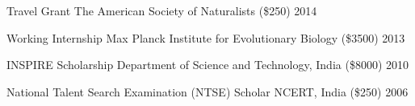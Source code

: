 \begin{cvhonors}
  \cvhonor
    {Travel Grant}
    {The American Society of Naturalists (\$250)}
    {2014}
    {}

  \cvhonor
    {Working Internship}
    {Max Planck Institute for Evolutionary Biology (\$3500)}
    {2013}
    {}

  \cvhonor
    {INSPIRE Scholarship}
    {Department of Science and Technology, India (\$8000)}
    {2010}
    {}

  \cvhonor
    {National Talent Search Examination (NTSE) Scholar}
    {NCERT, India (\$250)}
    {2006}
    {}
\end{cvhonors}
